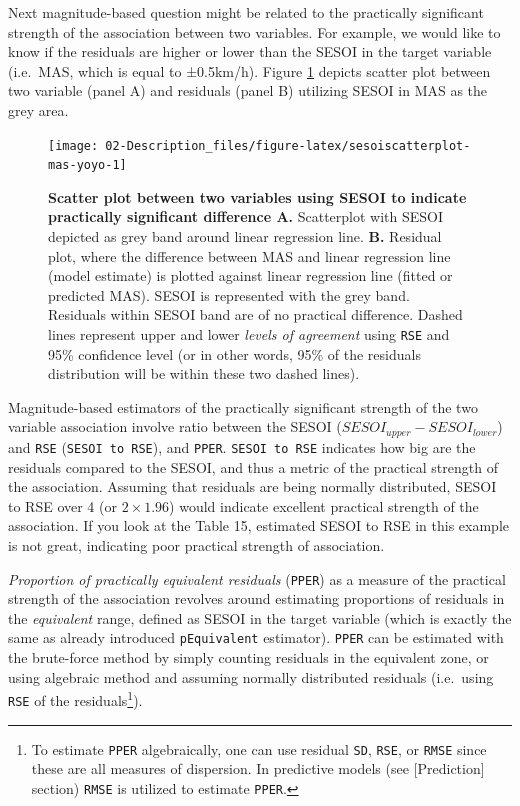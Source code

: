 \documentclass[
]{book}
\begin{document}
Next magnitude-based question might be related to the practically significant strength of the association between two variables. For example, we would like to know if the residuals are higher or lower than the SESOI in the target variable (i.e.~MAS, which is equal to ±0.5km/h). Figure \ref{fig:sesoiscatterplot-mas-yoyo} depicts scatter plot between two variable (panel A) and residuals (panel B) utilizing SESOI in MAS as the grey area.

\begin{figure}

{\centering \texttt{[image: 02-Description\_files/figure-latex/sesoiscatterplot-mas-yoyo-1]} 

}

\caption{\textbf{Scatter plot between two variables using SESOI to indicate practically significant difference A.} Scatterplot with SESOI depicted as grey band around linear regression line. \textbf{B.} Residual plot, where the difference between MAS and linear regression line (model estimate) is plotted against linear regression line (fitted or predicted MAS). SESOI is represented with the grey band. Residuals within SESOI band are of no practical difference. Dashed lines represent upper and lower \emph{levels of agreement} using \texttt{RSE} and 95\% confidence level (or in other words, 95\% of the residuals distribution will be within these two dashed lines).}\label{fig:sesoiscatterplot-mas-yoyo}
\end{figure}



Magnitude-based estimators of the practically significant strength of the two variable association involve ratio between the SESOI (\(SESOI_{upper} - SESOI_{lower}\)) and \texttt{RSE} (\texttt{SESOI\ to\ RSE}), and \texttt{PPER}. \texttt{SESOI\ to\ RSE} indicates how big are the residuals compared to the SESOI, and thus a metric of the practical strength of the association. Assuming that residuals are being normally distributed, SESOI to RSE over 4 (or \(2\times 1.96\)) would indicate excellent practical strength of the association. If you look at the Table 15, estimated SESOI to RSE in this example is not great, indicating poor practical strength of association.

\emph{Proportion of practically equivalent residuals} (\texttt{PPER}) as a measure of the practical strength of the association revolves around estimating proportions of residuals in the \emph{equivalent} range, defined as SESOI in the target variable (which is exactly the same as already introduced \texttt{pEquivalent} estimator). \texttt{PPER} can be estimated with the brute-force method by simply counting residuals in the equivalent zone, or using algebraic method and assuming normally distributed residuals (i.e.~using \texttt{RSE} of the residuals\footnote{To estimate \texttt{PPER} algebraically, one can use residual \texttt{SD}, \texttt{RSE}, or \texttt{RMSE} since these are all measures of dispersion. In predictive models (see {[}Prediction{]} section) \texttt{RMSE} is utilized to estimate \texttt{PPER}.}).
\end{document}
